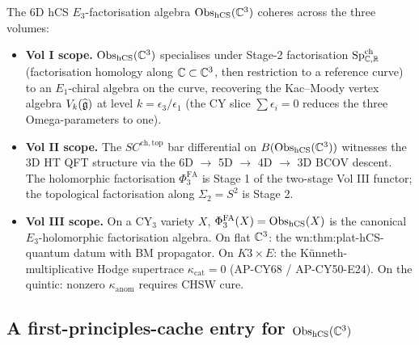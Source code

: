 \begin{theorem}\ClaimStatusTheorem
\label{opus12:thm:cross-vol}
The 6D hCS $E_3$-factorisation algebra $\mathrm{Obs}_{\mathrm{hCS}}(\mathbb{C}^3)$
coheres across the three volumes:
\begin{itemize}
\item \textbf{Vol I scope.} $\mathrm{Obs}_{\mathrm{hCS}}(\mathbb{C}^3)$ specialises under
Stage-2 factorisation $\mathrm{Sp}^{\mathrm{ch}}_{\mathbb{C}, \mathbb{R}}$
(factorisation homology along $\mathbb{C} \subset \mathbb{C}^3$, then restriction
to a reference curve) to an $E_1$-chiral algebra on the curve,
recovering the Kac--Moody vertex algebra
$V_k(\widehat{\mathfrak{g}})$ at level $k = \epsilon_3/\epsilon_1$ (the CY
slice $\sum \epsilon_i = 0$ reduces the three Omega-parameters to
one).
\item \textbf{Vol II scope.} The $SC^{\mathrm{ch,top}}$ bar
differential on $B(\mathrm{Obs}_{\mathrm{hCS}}(\mathbb{C}^3))$ witnesses the 3D HT QFT
structure via the 6D $\to$ 5D $\to$ 4D $\to$ 3D BCOV descent. The
holomorphic factorisation $\Phi^{\mathrm{FA}}_3$ is Stage 1 of the
two-stage Vol III functor; the topological factorisation along
$\Sigma_2 = S^2$ is Stage 2.
\item \textbf{Vol III scope.} On a CY$_3$ variety $X$,
$\Phi^{\mathrm{FA}}_3(X) = \mathrm{Obs}_{\mathrm{hCS}}(X)$ is the canonical
$E_3$-holomorphic factorisation algebra. On flat $\mathbb{C}^3$: the
wn:thm:plat-hCS-quantum datum with BM propagator. On $K3 \times E$:
the Künneth-multiplicative Hodge supertrace $\kappa_{\mathrm{cat}} = 0$
(AP-CY68 / AP-CY50-E24). On the quintic: nonzero
$\kappa_{\mathrm{anom}}$ requires CHSW cure.
\end{itemize}
\end{theorem}

\subsection{A first-principles-cache entry for $\mathrm{Obs}_{\mathrm{hCS}}(\mathbb{C}^3)$}
\label{opus12:sec:cache}

